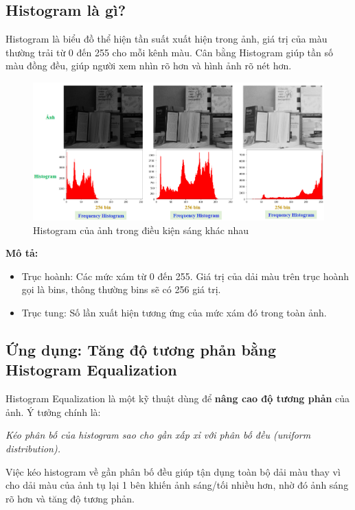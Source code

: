 \documentclass[11pt]{article}
\begin{document}
\subsection{Histogram là gì?}
Histogram là biểu đồ thể hiện tần suất xuất hiện trong ảnh, giá trị của màu thường trải từ 0 đến 255 cho mỗi kênh màu. Cân bằng Histogram giúp tần số màu đồng đều, giúp người xem nhìn rõ hơn và hình ảnh rõ nét hơn.

\begin{figure}[H]
    \centering
    \includegraphics[width=0.8\linewidth]{images/histogram.png} %
    \caption{Histogram của ảnh trong điều kiện sáng khác nhau}
\end{figure}

\textbf{Mô tả:}
\begin{itemize}
  \item Trục hoành: Các mức xám từ 0 đến 255. Giá trị của dải màu trên trục hoành gọi là bins, thông thường bins sẽ có 256 giá trị.
  \item Trục tung: Số lần xuất hiện tương ứng của mức xám đó trong toàn ảnh.
\end{itemize}

\subsection{Ứng dụng: Tăng độ tương phản bằng Histogram Equalization}

Histogram Equalization là một kỹ thuật dùng để \textbf{nâng cao độ tương phản} của ảnh. Ý tưởng chính là:

\begin{center}
\textit{Kéo phân bố của histogram sao cho gần xấp xỉ với phân bố đều (uniform distribution).}
\end{center}

Việc kéo histogram về gần phân bố đều giúp tận dụng toàn bộ dải màu thay vì cho dải màu của ảnh tụ lại 1 bên khiến ảnh sáng/tối nhiều hơn, nhờ đó ảnh sáng rõ hơn và tăng độ tương phản.
\end{document}
